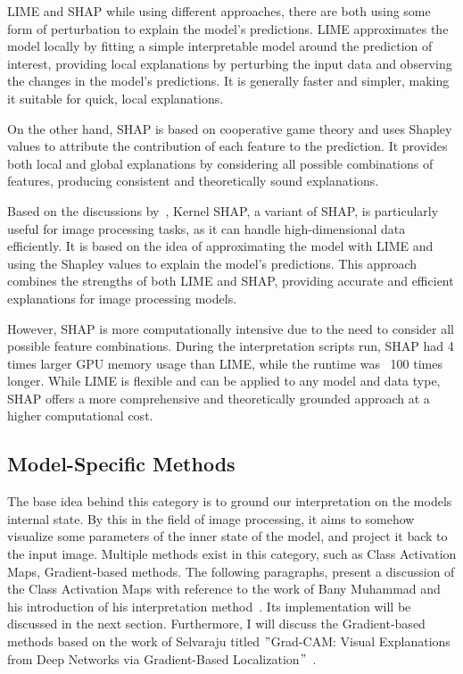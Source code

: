 LIME and SHAP while using
different approaches, there are both using some form of perturbation to explain the model's predictions.
LIME approximates the model locally by fitting a simple interpretable model around
the prediction of interest, providing local explanations by perturbing the input
data and observing the changes in the model's predictions.
It is generally faster and simpler, making it suitable for quick, local explanations.


On the other hand, SHAP is based on cooperative game theory and uses Shapley values to attribute the contribution of
each feature to the prediction.
It provides both local and global explanations by considering all possible combinations of features,
producing consistent and theoretically sound explanations.


Based on the discussions by~\cite{lundberg2017unifiedapproachinterpretingmodel}, Kernel SHAP, a variant of SHAP,
is particularly useful for image processing tasks, as it can handle high-dimensional data efficiently.
It is based on the idea of approximating the model with LIME and using the Shapley values to explain
the model's predictions.
This approach combines the strengths of both LIME and SHAP, providing accurate and efficient explanations for
image processing models.

However, SHAP is more computationally intensive due to the need to consider all possible feature combinations.
During the interpretation scripts run, SHAP had 4 times larger GPU memory usage than LIME, while the runtime was ~100 times longer.
While LIME is flexible and can be applied to any model and data type, SHAP offers a more comprehensive and theoretically
grounded approach at a higher computational cost.

\subsection{Model-Specific Methods}\label{subsec:model-specific-methods}
The base idea behind this category is to ground our interpretation on the models internal state.
By this in the field of image processing, it aims to somehow visualize some parameters of the inner  state of the model, and project it back to the input image.
Multiple methods exist in this category, such as Class Activation Maps, Gradient-based methods.
The following paragraphs, present a discussion of the Class Activation Maps with reference to the work of Bany Muhammad and his introduction of his interpretation method~\cite{Muhammad_2020}.
Its implementation will be discussed in the next section.
Furthermore, I will discuss the Gradient-based methods based on the work of Selvaraju titled \("\)Grad-CAM: Visual
Explanations from Deep Networks via Gradient-Based Localization\("\)~\cite{Selvaraju_2019}.




